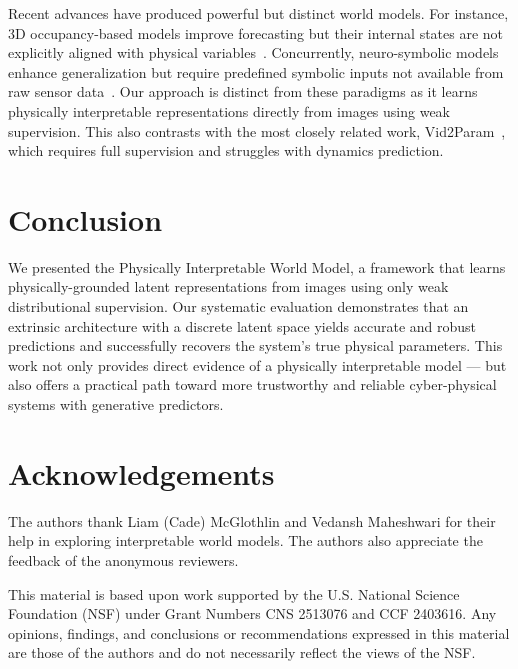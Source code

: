 \documentclass[nonacm,sigconf]{acmart}
\begin{document}
Recent advances have produced powerful but distinct world models. For instance, 3D occupancy-based models improve forecasting but their internal states are not explicitly aligned with physical variables~\cite[]{zheng2024occworld,min2023uniworld,yan2024renderworld,zuo2024gaussianworld}. Concurrently, neuro-symbolic models enhance generalization but require predefined symbolic inputs not available from raw sensor data~\cite[]{balloch2023neuro,liang2024visualpredicator}. Our approach is distinct from these paradigms as it learns physically interpretable representations directly from images using weak supervision. This also contrasts with the most closely related work, Vid2Param~\cite[]{asenov2019vid2param}, which requires full supervision and struggles with dynamics prediction.







\section{Conclusion}\label{sec:conclusion}
We presented the Physically Interpretable World Model, a framework that learns physically-grounded latent representations from images using only weak distributional supervision. Our systematic evaluation demonstrates that an extrinsic architecture with a discrete latent space yields accurate and robust predictions and successfully recovers the system's true physical parameters. This work not only provides direct evidence of a physically interpretable model --- but also offers a practical path toward more trustworthy and reliable cyber-physical systems with generative predictors. 


\section*{Acknowledgements}\label{sec:ack}
 
The authors thank Liam (Cade) McGlothlin and Vedansh Maheshwari for their help in exploring interpretable world models. The authors also appreciate the feedback of the anonymous reviewers. 

This material is based upon work supported by the U.S. National Science Foundation (NSF) under Grant Numbers CNS 2513076 and CCF 2403616. Any opinions, findings, and conclusions or recommendations expressed in this material are those of the authors and do not necessarily reflect the views of the NSF.
\end{document}
